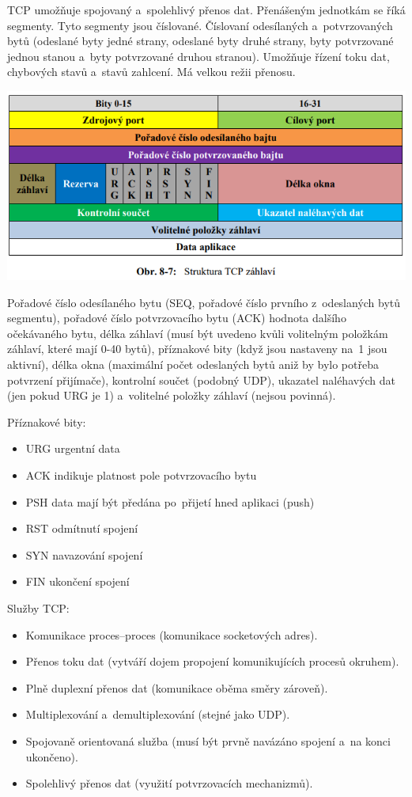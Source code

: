 TCP umožňuje spojovaný a~spolehlivý přenos dat. Přenášeným jednotkám se říká segmenty. Tyto segmenty jsou číslované. Číslovaní odesílaných a~potvrzovaných bytů (odeslané byty jedné strany, odeslané byty druhé strany, byty potvrzované jednou stanou a~byty potvrzované druhou stranou). Umožňuje řízení toku dat, chybových stavů a~stavů zahlcení. Má velkou režii přenosu.

\begin{center}
\includegraphics[scale = 0.5]{images/-051.png}
\end{center}

Pořadové číslo odesílaného bytu (SEQ, pořadové číslo prvního z~odeslaných bytů segmentu), pořadové číslo potvrzovacího bytu (ACK) hodnota dalšího očekávaného bytu, délka záhlaví (musí být uvedeno kvůli volitelným položkám záhlaví, které mají 0-40 bytů), příznakové bity (když jsou nastaveny na~1 jsou aktivní), délka okna (maximální počet odeslaných bytů aniž by bylo potřeba potvrzení přijímače), kontrolní součet (podobný UDP), ukazatel naléhavých dat (jen pokud URG je 1) a~volitelné položky záhlaví (nejsou povinná).

Příznakové bity:
\begin{itemize}[noitemsep]
    \item URG urgentní data
    \item ACK indikuje platnost pole potvrzovacího bytu
    \item PSH data mají být předána po~přijetí hned aplikaci (push)
    \item RST odmítnutí spojení
    \item SYN navazování spojení
    \item FIN ukončení spojení
\end{itemize}

Služby TCP:
\begin{itemize}[noitemsep]
    \item Komunikace proces--proces (komunikace socketových adres).
    \item Přenos toku dat (vytváří dojem propojení komunikujících procesů okruhem).
    \item Plně duplexní přenos dat (komunikace oběma směry zároveň).
    \item Multiplexování a~demultiplexování (stejné jako UDP).
    \item Spojovaně orientovaná služba (musí být prvně navázáno spojení a~na konci ukončeno).
    \item Spolehlivý přenos dat (využití potvrzovacích mechanizmů).
\end{itemize}

